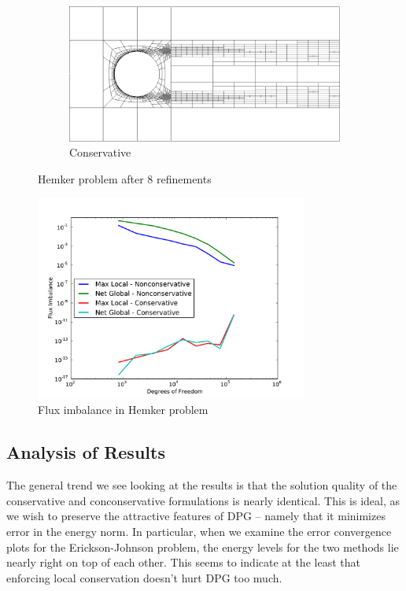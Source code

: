 \documentclass[letterpaper]{article}
\begin{document}
\begin{figure}[p]
\begin{subfigure}[t]{0.6\textwidth}
\end{subfigure}
\begin{subfigure}[t]{0.6\textwidth}
\centering
\includegraphics[width=\textwidth]{figs/Hemker/modified8c_mesh.png}
\caption{Conservative}
\label{fig:hemkerModified8c}
\end{subfigure}
\caption{Hemker problem after 8 refinements}
\label{fig:hemker8}
\end{figure}

\begin{figure}[p]
\centering
\centering
\includegraphics[width=0.8\textwidth]{figs/Hemker/modifiedFlux.pdf}
\caption{Flux imbalance in Hemker problem}
\label{fig:hemkerFlux}
\end{figure}

\subsection{Analysis of Results}\label{sec:problemAnalysis}
The general trend we see looking at the results is that the solution quality
of the conservative and conconservative formulations is nearly identical. This
is ideal, as we wish to preserve the attractive features of DPG --
namely that it minimizes error in the energy norm. In particular, when we
examine the error convergence plots for the Erickson-Johnson problem, the
energy levels for the two methods lie nearly right on top of each other. This
seems to indicate at the least that enforcing local conservation doesn't hurt
DPG too much.
\end{document}

